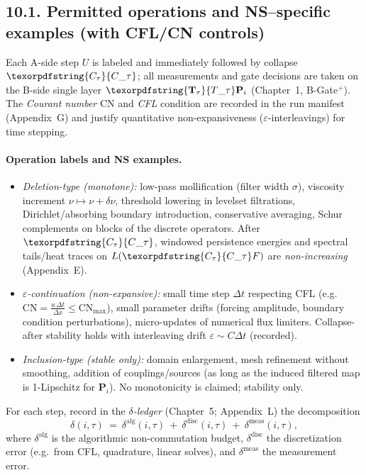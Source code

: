 \documentclass[11pt]{article}
\DeclareRobustCommand{\hyp}{\nobreakdash-}
\numberwithin{equation}{section}
\theoremstyle{definition}
\DeclareRobustCommand{\Ttau}{\texorpdfstring{\ensuremath{\mathbf{T}_{\tau}}}{T\_\tau}}
\DeclareRobustCommand{\Ctau}{\texorpdfstring{\ensuremath{C_{\tau}}}{C\_\tau}}
\begin{document}
\subsection*{10.1. Permitted operations and NS--specific examples (with CFL/CN controls)}
Each A\hyp side step \(U\) is labeled and immediately followed by collapse \(\Ctau\); all measurements and gate decisions are taken on the B\hyp side single layer \(\Ttau\mathbf{P}_i\) (Chapter~1, B\hyp Gate\(^{+}\)). The \emph{Courant number} \(\mathrm{CN}\) and \emph{CFL} condition are recorded in the run manifest (Appendix~G) and justify quantitative non\hyp expansiveness (\(\varepsilon\)\hyp interleavings) for time stepping.

\paragraph{Operation labels and NS examples.}
\begin{itemize}
  \item \emph{Deletion\hyp type (monotone):} low\hyp pass mollification (filter width \(\sigma\)), viscosity increment \(\nu\mapsto \nu+\delta\nu\), threshold lowering in levelset filtrations, Dirichlet/absorbing boundary introduction, conservative averaging, Schur complements on blocks of the discrete operators. After \(\Ctau\), windowed persistence energies and spectral tails/heat traces on \(L(\Ctau F)\) are \emph{non\hyp increasing} (Appendix~E).
  \item \emph{\(\varepsilon\)\hyp continuation (non\hyp expansive):} small time step \(\Delta t\) respecting CFL (e.g.\ \(\mathrm{CN}=\frac{u\,\Delta t}{\Delta x}\le \mathrm{CN}_{\max}\)), small parameter drifts (forcing amplitude, boundary condition perturbations), micro\hyp updates of numerical flux limiters. Collapse\hyp after stability holds with interleaving drift \(\varepsilon\!\sim\!C\Delta t\) (recorded).
  \item \emph{Inclusion\hyp type (stable only):} domain enlargement, mesh refinement without smoothing, addition of couplings/sources (as long as the induced filtered map is 1\hyp Lipschitz for \(\mathbf{P}_i\)). No monotonicity is claimed; stability only.
\end{itemize}
For each step, record in the \emph{\(\delta\)\hyp ledger} (Chapter~5; Appendix~L) the decomposition
\[
\delta(i,\tau)\ =\ \delta^{\mathrm{alg}}(i,\tau)\ +\ \delta^{\mathrm{disc}}(i,\tau)\ +\ \delta^{\mathrm{meas}}(i,\tau),
\]
where \(\delta^{\mathrm{alg}}\) is the algorithmic non\hyp commutation budget, \(\delta^{\mathrm{disc}}\) the discretization error (e.g.\ from CFL, quadrature, linear solves), and \(\delta^{\mathrm{meas}}\) the measurement error.
\end{document}
